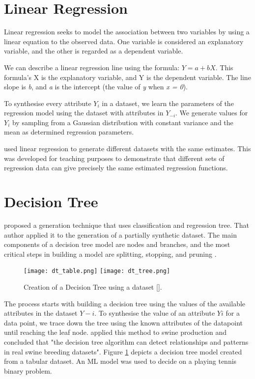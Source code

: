 \section{Linear Regression}
Linear regression seeks to model the association between two variables by using a linear equation to the observed data. One variable is considered an explanatory variable, and the other is regarded as a dependent variable.

We can describe a linear regression line using the formula: \(Y = a + bX\). This formula's X is the explanatory variable, and Y is the dependent variable. The line slope is \textit{b}, and \textit{a} is the intercept (the value of \textit{y} when \textit{x = 0}).

To synthesise every attribute \(Y_{i}\) in a dataset, we learn the parameters of the regression model using the dataset with attributes in \(Y_{-i}\). We generate values for \(Y_{i}\) by sampling from a Gaussian distribution with constant variance and the mean as determined regression parameters.

\cite{regression} used linear regression to generate different datasets with the same estimates. This was developed for teaching purposes to demonstrate that different sets of regression data can give precisely the same estimated regression functions. 

\section{Decision Tree}
\cite{reiter2005using} proposed a generation technique that uses classification and regression tree. That author applied it to the generation of a partially synthetic dataset. The main components of a decision tree model are nodes and branches, and the most critical steps in building a model are splitting, stopping, and pruning \citep{song2015decision}.
\begin{figure}[t]
  \begin{center}
    \leavevmode
    \texttt{[image: dt\_table.png]}
    \texttt{[image: dt\_tree.png]}
    \caption[Creation of a Decision Tree using a dataset]{Creation of a Decision Tree using a dataset [\cite{8226246}].}
    \label{fig:destree}
  \end{center}
\end{figure}

The process starts with building a decision tree using the values of the available attributes in the dataset \(Y-i\). To synthesise the value of an attribute \(Yi\) for a data point, we trace down the tree using the known attributes of the datapoint until reaching the leaf node. \cite{kirchner2004decision} applied this method to swine production and concluded that "the decision tree algorithm can detect relationships and patterns in real swine breeding datasets". Figure \ref{fig:destree} depicts a decision tree model created from a tabular dataset. An ML model was used to decide on a playing tennis binary problem. 


